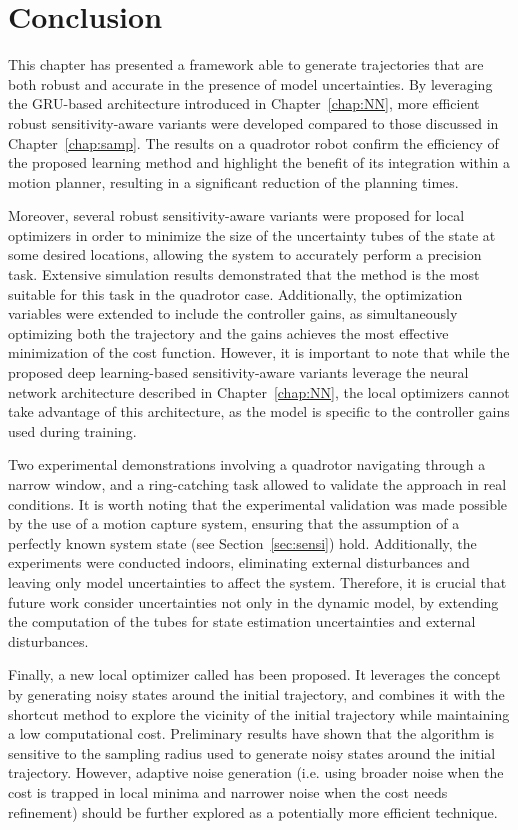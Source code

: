 \section{Conclusion} \label{sec:Conclusion}

This chapter has presented a framework able to generate trajectories that are both robust and accurate in the presence of model uncertainties.
By leveraging the GRU-based architecture introduced in Chapter~\ref{chap:NN}, more efficient robust sensitivity-aware variants were developed compared to those discussed in Chapter~\ref{chap:samp}.
The results on a quadrotor robot confirm the efficiency of the proposed learning method and highlight the benefit of its integration within a motion planner, resulting in a significant reduction of the planning times. 

Moreover, several robust sensitivity-aware variants were proposed for local optimizers in order to minimize the size of the uncertainty tubes of the state at some desired locations, allowing the system to accurately perform a precision task.
Extensive simulation results demonstrated that the  method is the most suitable for this task in the quadrotor case.
Additionally, the optimization variables were extended to include the controller gains, as simultaneously optimizing both the trajectory and the gains achieves the most effective minimization of the cost function.
However, it is important to note that while the proposed deep learning-based sensitivity-aware variants leverage the neural network architecture described in Chapter~\ref{chap:NN}, the local optimizers cannot take advantage of this architecture, as the model is specific to the controller gains used during training.

Two experimental demonstrations involving a quadrotor navigating through a narrow window, and a ring-catching task allowed to validate the approach in real conditions. 
It is worth noting that the experimental validation was made possible by the use of a motion capture system, ensuring that the assumption of a perfectly known system state (see Section~\ref{sec:sensi}) hold.
Additionally, the experiments were conducted indoors, eliminating external disturbances and leaving only model uncertainties to affect the system.
Therefore, it is crucial that future work consider uncertainties not only in the dynamic model, by extending the computation of the tubes for state estimation uncertainties and external disturbances. 

Finally, a new local optimizer called  has been proposed. 
It leverages the  concept by generating noisy states around the initial trajectory, and combines it with the shortcut method to explore the vicinity of the initial trajectory while maintaining a low computational cost.
Preliminary results have shown that the algorithm is sensitive to the sampling radius used to generate noisy states around the initial trajectory. 
However, adaptive noise generation (i.e. using broader noise when the cost is trapped in local minima and narrower noise when the cost needs refinement) should be further explored as a potentially more efficient technique.